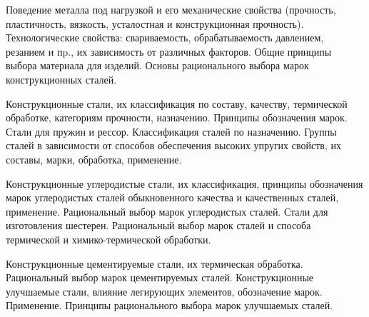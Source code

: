 \documentclass[
	14pt,
	a4paper,
	]
	{scrartcl}
\begin{document}
\newpage


\shapk
{}
\setcounter{zad}{0}

\vfill
\z Поведение металла под нагрузкой и его механические свойства (прочность, пластичность, вязкость, усталостная и конструкционная прочность). Технологические свойства: свариваемость, обрабатываемость давлением, резанием и пp., их зависимость от различных факторов. Общие принципы выбора материала для изделий.
 \vfill
\z Основы рационального выбора марок конструкционных сталей.
 \vfill

\vfill

\newpage


\shapk
{}
\setcounter{zad}{0}

\vfill
\z Конструкционные стали, их классификация по составу, качеству, термической обработке, категориям прочности, назначению. Принципы обозначения марок.
 \vfill
\z Стали для пружин и рессор. Классификация сталей по назначению. Группы сталей в зависимости от способов обеспечения высоких упругих свойств, их составы, марки, обработка, применение.
 \vfill

\vfill

\newpage


\shapk
{}
\setcounter{zad}{0}

\vfill
\z Конструкционные углеродистые стали, их классификация, принципы обозначения марок углеродистых сталей обыкновенного качества и качественных сталей, применение. Рациональный выбор марок углеродистых сталей.
 \vfill
\z Стали для изготовления шестерен. Рациональный выбор марок сталей и способа термической и химико-термической обработки.
 \vfill

\vfill

\newpage


\shapk
{}
\setcounter{zad}{0}

\vfill
\z Конструкционные цементируемые стали, их термическая обработка. Рациональный выбор марок цементируемых сталей.
 \vfill
\z Конструкционные улучшаемые стали, влияние легирующих элементов, обозначение марок. Применение. Принципы рационального выбора марок улучшаемых сталей.
 \vfill

\vfill

\newpage
\end{document}
